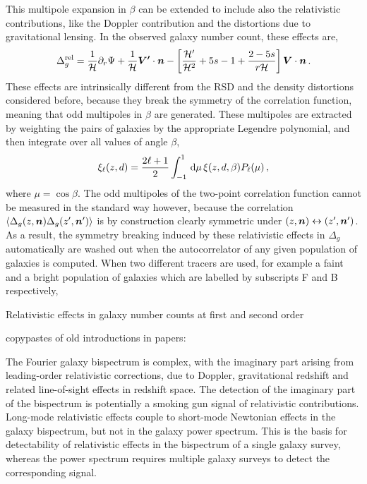 This multipole expansion in $\beta$ can be extended to include also the relativistic contributions, like the Doppler contribution and the distortions due to gravitational lensing. In the observed galaxy number count, these effects are, 
\begin{equation}
	\Delta_g^{\mathrm{rel}} = \frac{1}{\mathcal{H}} \partial_r \Psi + \frac{1}{\mathcal{H}} \bm{V'} \cdot \bm {n} - \left[ \frac{\mathcal{H}'}{\mathcal{H}^2}  + 5 s - 1 + \frac{2 - 5s}{r \mathcal{H}} \right] \bm{V} \cdot \bm {n}\,.
\end{equation}
These effects are intrinsically different from the RSD and the density distortions considered before, because they break the symmetry of the correlation function, meaning that odd multipoles in $\beta$ are generated. These multipoles are extracted by weighting the pairs of galaxies by the appropriate Legendre polynomial, and then integrate over all values of angle $\beta$,
\begin{equation}
	\xi_\ell(z,d) = \frac{2 \ell + 1}{2} \int_{-1}^1 \,\mathrm{d}\mu\, \xi(z,d,\beta) P_\ell(\mu)\,,
\end{equation}
where $\mu = \cos\beta$. The odd multipoles of the two-point correlation function cannot be measured in the standard way however, because the correlation $\langle \Delta_g(z,\bm {n}) \Delta_g(z',\bm {n}') \rangle$ is by construction clearly symmetric under $(z,\bm {n}) \leftrightarrow (z', \bm {n}')$. As a result, the symmetry breaking induced by these relativistic effects in $\Delta_g$ automatically are washed out when the autocorrelator of any given population of galaxies is computed. When two different tracers are used, for example a faint and a bright population of galaxies which are labelled by subscripts F and B respectively, 

\iffalse


Relativistic effects in galaxy number counts at first and second order

copypastes of old introductions in papers:

The Fourier galaxy bispectrum is complex, with the imaginary part arising from leading-order relativistic corrections, due to Doppler, gravitational redshift  and related line-of-sight effects  in redshift space. The detection of the imaginary  part of the bispectrum is potentially a smoking gun signal of relativistic contributions. Long-mode relativistic effects couple to  short-mode Newtonian effects in the galaxy bispectrum, but not in the galaxy power spectrum. This is  the basis for detectability of relativistic effects in the bispectrum of a single galaxy survey, whereas the power spectrum requires multiple galaxy surveys to detect the corresponding signal.

